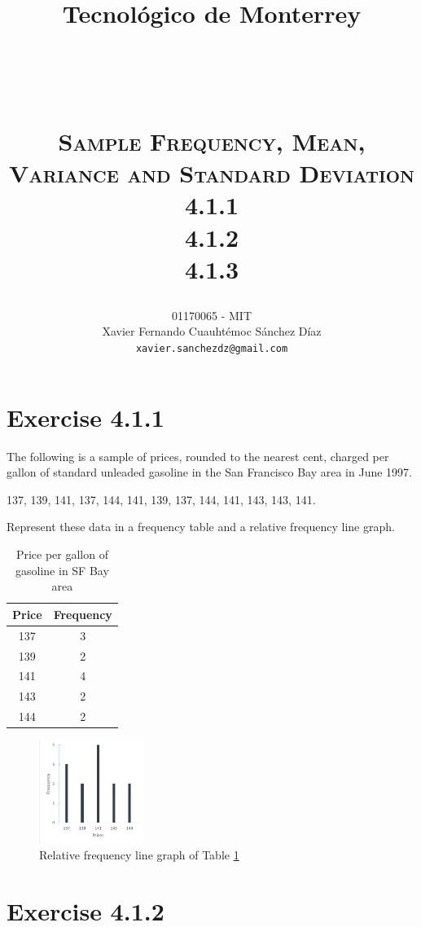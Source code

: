 \documentclass[titlepage, letterpaper, fleqn]{article}
\title{
\vspace{1in}
\textbf{Tecnológico de Monterrey} \\
\vspace{0.5in}
\textmd{\mahclass} \\
\large{\textit{\mahteacher}} \\
\vspace{0.5in}
\textsc{\mahtitle}\\
\textsc{Sample Frequency, Mean, Variance and Standard Deviation}\\
\textsc{4.1.1}\\
\textsc{4.1.2}\\
\textsc{4.1.3}\\
\author{01170065  - MIT \\
Xavier Fernando Cuauhtémoc Sánchez Díaz \\
\texttt{xavier.sanchezdz@gmail.com}}
\date{\mahdate}
}
\newcommand{\spacepls}{\vspace{5mm}}
\begin{document}
\begin{titlepage}
\maketitle
\end{titlepage}

%
%

\section{Exercise 4.1.1}

{\large The following is a sample of prices, rounded to the nearest cent, charged per gallon of standard unleaded gasoline in the San Francisco Bay area in June 1997.

137, 139, 141, 137, 144, 141, 139, 137, 144, 141, 143, 143, 141.

Represent these data in a frequency table and a relative frequency line graph.}

\begin{table}[h!]
\centering
\begin{tabular}{@{}cc@{}}
\toprule
Price & Frequency \\ \midrule
137   & 3         \\
139   & 2         \\
141   & 4         \\
143   & 2         \\
144   & 2         \\ \bottomrule
\end{tabular}
\caption{Price per gallon of gasoline in SF Bay area}
\label{tab:4.1.1}
\end{table}

\spacepls

\begin{figure}[h!]
	\centering
	\includegraphics[width=0.3\textwidth]{img_4_1_1}
	\caption{Relative frequency line graph of Table \ref{tab:4.1.1}}
	\label{fig:4.1.1}
\end{figure}

\section{Exercise 4.1.2}
\end{document}
